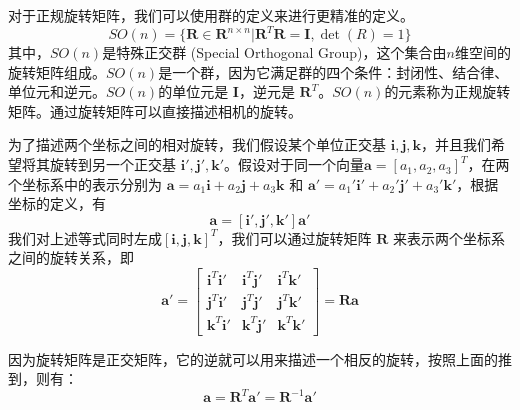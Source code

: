 对于正规旋转矩阵，我们可以使用群的定义来进行更精准的定义。
\begin{equation}
    SO(n) = \{\boldsymbol{R} \in \boldsymbol{R}^{n \times n} | \boldsymbol{R}^T\boldsymbol{R} = \boldsymbol{I}, \det (R) = 1\}
\end{equation}
其中，$SO(n)$是特殊正交群 (Special Orthogonal Group)，这个集合由$n$维空间的旋转矩阵组成。$SO(n)$是一个群，因为它满足群的四个条件：封闭性、结合律、单位元和逆元。$SO(n)$的单位元是 $\boldsymbol{I}$，逆元是 $\boldsymbol{R}^T$。$SO(n)$的元素称为正规旋转矩阵。通过旋转矩阵可以直接描述相机的旋转。

为了描述两个坐标之间的相对旋转，我们假设某个单位正交基 $\boldsymbol{i}, \boldsymbol{j}, \boldsymbol{k}$，并且我们希望将其旋转到另一个正交基 $\boldsymbol{i}', \boldsymbol{j}', \boldsymbol{k}'$。假设对于同一个向量$\boldsymbol{a} = [a_1, a_2, a_3]^T$，在两个坐标系中的表示分别为 $\boldsymbol{a} = a_1\boldsymbol{i} + a_2\boldsymbol{j} + a_3\boldsymbol{k}$ 和 $\boldsymbol{a}' = a_1'\boldsymbol{i}' + a_2'\boldsymbol{j}' + a_3'\boldsymbol{k}'$，根据坐标的定义，有
\begin{equation}
    [\boldsymbol{i}, \boldsymbol{j}, \boldsymbol{k}] \boldsymbol{a} = [\boldsymbol{i}', \boldsymbol{j}', \boldsymbol{k}'] \boldsymbol{a}'
\end{equation}
我们对上述等式同时左成$[\boldsymbol{i}, \boldsymbol{j}, \boldsymbol{k}]^T$，我们可以通过旋转矩阵 $\boldsymbol{R}$ 来表示两个坐标系之间的旋转关系，即
\begin{equation}
    \boldsymbol{a}' = 
    \begin{bmatrix}
    \boldsymbol{i}^T \boldsymbol{i}' & \boldsymbol{i}^T \boldsymbol{j}' & \boldsymbol{i}^T \boldsymbol{k}' \\
    \boldsymbol{j}^T \boldsymbol{i}' & \boldsymbol{j}^T \boldsymbol{j}' & \boldsymbol{j}^T \boldsymbol{k}' \\
    \boldsymbol{k}^T \boldsymbol{i}' & \boldsymbol{k}^T \boldsymbol{j}' & \boldsymbol{k}^T \boldsymbol{k}'
    \end{bmatrix}
    =
    \boldsymbol{R} \boldsymbol{a}
\end{equation}

因为旋转矩阵是正交矩阵，它的逆就可以用来描述一个相反的旋转，按照上面的推到，则有：
\begin{equation}
    \boldsymbol{a} = \boldsymbol{R}^T \boldsymbol{a}' = \boldsymbol{R}^{-1} \boldsymbol{a}'
\end{equation}


